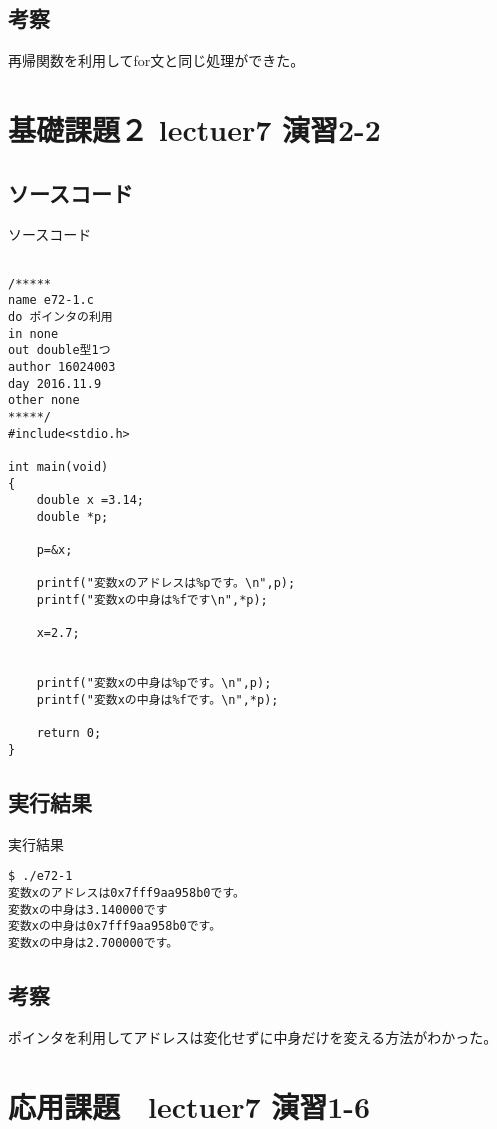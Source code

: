 \documentclass[a4j,titlepage]{jarticle}
\begin{document}
\subsection{考察}
再帰関数を利用してfor文と同じ処理ができた。

\section{基礎課題２ lectuer7 演習2-2}
\subsection{ソースコード}
\begin{breakitembox}[l]{ソースコード}
\begin{verbatim}

/*****
name e72-1.c
do ポインタの利用 
in none
out double型1つ
author 16024003
day 2016.11.9
other none 
*****/
#include<stdio.h>

int main(void)
{
    double x =3.14;
    double *p;

    p=&x;

    printf("変数xのアドレスは%pです。\n",p);
    printf("変数xの中身は%fです\n",*p);

    x=2.7;


    printf("変数xの中身は%pです。\n",p);
    printf("変数xの中身は%fです。\n",*p);

    return 0;
}
\end{verbatim}
\end{breakitembox}

\subsection{実行結果}
\begin{itembox}[l]{実行結果}
\begin{verbatim}
$ ./e72-1
変数xのアドレスは0x7fff9aa958b0です。
変数xの中身は3.140000です
変数xの中身は0x7fff9aa958b0です。
変数xの中身は2.700000です。
\end{verbatim}
\end{itembox}

\subsection{考察}
ポインタを利用してアドレスは変化せずに中身だけを変える方法がわかった。

\section{応用課題　lectuer7 演習1-6}
\end{document}

